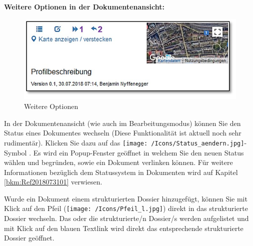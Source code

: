 \vspace{\baselineskip}

\textbf{Weitere Optionen in der Dokumentenansicht:}

\begin{figure} 
  \vspace{-25pt} 
  \begin{center}
    \includegraphics[width=1\linewidth]{../chapters/11_Dokumentenablage/pictures/dok_weitereOptionen.jpg}
  \end{center}
  \vspace{-20pt}
  \caption{Weitere Optionen}
  \vspace{-10pt}
\end{figure}

In der Dokumentenansicht (wie auch im Bearbeitungsmodus) können Sie den Status eines Dokumentes wechseln (Diese Funktionalität ist aktuell noch sehr rudimentär). Klicken Sie dazu auf das \texttt{[image: /Icons/Status\_aendern.jpg]}-Symbol . Es wird ein Popup-Fenster geöffnet in welchem Sie den neuen Status wählen und begründen, sowie ein Dokument verlinken können. Für weitere Informationen bezüglich dem Statussystem in Dokumenten wird auf Kapitel \ref{bkm:Ref2018073101} verwiesen.

\vspace{\baselineskip}

Wurde ein Dokument einem strukturierten Dossier hinzugefügt, können Sie mit Klick auf den Pfeil (\texttt{[image: /Icons/Pfeil\_l.jpg]})  direkt in das strukturierte Dossier wechseln. Das oder die strukturierte/n Dossier/s werden aufgelistet und mit Klick auf den blauen Textlink  wird direkt das entsprechende strukturierte Dossier geöffnet.

\begin{figure}[H]
\end{figure}

